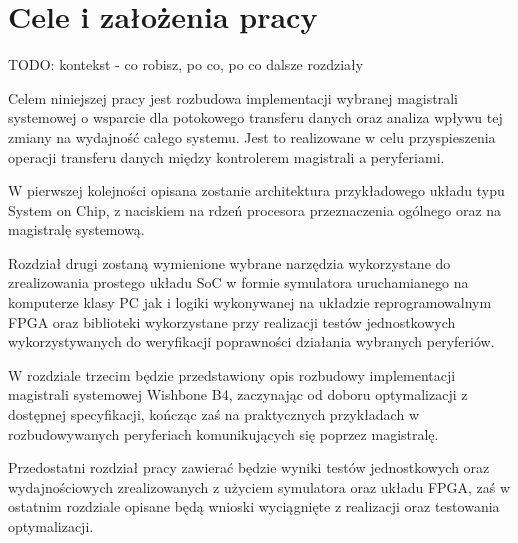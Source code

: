 \section{Cele i założenia pracy}
TODO: kontekst - co robisz, po co, po co dalsze rozdziały

Celem niniejszej pracy jest rozbudowa implementacji wybranej magistrali systemowej o wsparcie dla potokowego transferu danych oraz analiza wpływu tej zmiany na wydajność całego systemu. Jest to realizowane w celu przyspieszenia operacji transferu danych między kontrolerem magistrali a peryferiami.

W pierwszej kolejności opisana zostanie architektura przykładowego układu typu System on Chip, z naciskiem na rdzeń procesora przeznaczenia ogólnego oraz na magistralę systemową.

Rozdział drugi zostaną wymienione wybrane narzędzia wykorzystane do zrealizowania prostego układu SoC w formie symulatora uruchamianego na komputerze klasy PC jak i logiki wykonywanej na układzie reprogramowalnym FPGA oraz biblioteki wykorzystane przy realizacji testów jednostkowych wykorzystywanych do weryfikacji poprawności działania wybranych peryferiów.

W rozdziale trzecim będzie przedstawiony opis rozbudowy implementacji magistrali systemowej Wishbone B4, zaczynając od doboru optymalizacji z dostępnej specyfikacji, kończąc zaś na praktycznych przykładach w rozbudowywanych peryferiach komunikujących się poprzez magistralę.

Przedostatni rozdział pracy zawierać będzie wyniki testów jednostkowych oraz wydajnościowych zrealizowanych z użyciem symulatora oraz układu FPGA, zaś w ostatnim rozdziale opisane będą wnioski wyciągnięte z realizacji oraz testowania optymalizacji.
